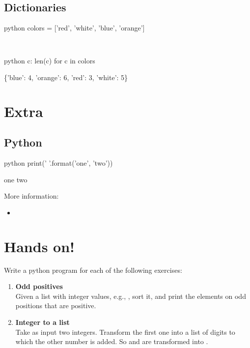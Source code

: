 \documentclass[aspectratio=1610,t]{beamer}
\begin{document}
\subsection{Dictionaries}
\begin{pframe}
 \begin{ipython}
  \begin{pythonin}{python}
colors = ['red', 'white', 'blue', 'orange']
  \end{pythonin}
  \\
  \begin{pythonin}{python}
{c: len(c) for c in colors}
  \end{pythonin}
  \begin{pythonout}
\{'blue': 4, 'orange': 6, 'red': 3, 'white': 5\}
  \end{pythonout}
 \end{ipython}
\end{pframe}



\section*{Extra}

\subsection{Python }
\begin{pframe}
 \begin{ipython}
  \begin{pythonin}{python}
print('{} {}'.format('one', 'two'))
  \end{pythonin}
  \begin{pythonout}
one two
  \end{pythonout}
 \end{ipython}
 \bigskip

 More information:
 \begin{itemize}
  \item {}
 \end{itemize}
\end{pframe}


\section{Hands on!}
\begin{pframe}
 \vspace{-0.5cm}
 Write a python program for each of the following exercises:
\begin{enumerate}
  \item \textbf{Odd positives} \\
        Given a list with integer values, e.g., \emp{[10, -4, -5, 5]}, sort it, and print the elements on odd positions that are positive.
  \item \textbf{Integer to a list} \\
        Take as input two integers. Transform the first one into a list of digits to which the other number is added. So  and  are transformed into \emp{[5,6,7,8]}.
 \end{enumerate}
\end{pframe}
\end{document}

